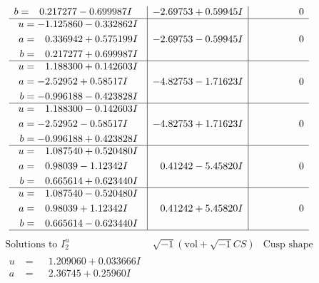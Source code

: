 \documentclass[1p]{elsarticle_modified}
\theoremstyle{definition}
\newcommand{\I}{\sqrt{-1}}
\begin{document}
$$\begin{array}{c|c|c}
\begin{aligned}
b &= \phantom{-}0.217277 - 0.699987 I\end{aligned}
 & -2.69753 + 0.59945 I & \phantom{-0.000000 } 0 \\ \hline\begin{aligned}
u &= -1.125860 - 0.332862 I \\
a &= \phantom{-}0.336942 + 0.575199 I \\
b &= \phantom{-}0.217277 + 0.699987 I\end{aligned}
 & -2.69753 - 0.59945 I & \phantom{-0.000000 } 0 \\ \hline\begin{aligned}
u &= \phantom{-}1.188300 + 0.142603 I \\
a &= -2.52952 + 0.58517 I \\
b &= -0.996188 - 0.423828 I\end{aligned}
 & -4.82753 - 1.71623 I & \phantom{-0.000000 } 0 \\ \hline\begin{aligned}
u &= \phantom{-}1.188300 - 0.142603 I \\
a &= -2.52952 - 0.58517 I \\
b &= -0.996188 + 0.423828 I\end{aligned}
 & -4.82753 + 1.71623 I & \phantom{-0.000000 } 0 \\ \hline\begin{aligned}
u &= \phantom{-}1.087540 + 0.520480 I \\
a &= \phantom{-}0.98039 - 1.12342 I \\
b &= \phantom{-}0.665614 + 0.623440 I\end{aligned}
 & \phantom{-}0.41242 - 5.45820 I & \phantom{-0.000000 } 0 \\ \hline\begin{aligned}
u &= \phantom{-}1.087540 - 0.520480 I \\
a &= \phantom{-}0.98039 + 1.12342 I \\
b &= \phantom{-}0.665614 - 0.623440 I\end{aligned}
 & \phantom{-}0.41242 + 5.45820 I & \phantom{-0.000000 } 0\\
 \hline 
 \end{array}$$\newpage$$\begin{array}{c|c|c}  
\text{Solutions to }I^u_{2}& \I (\text{vol} + \sqrt{-1}CS) & \text{Cusp shape}\\
 \hline 
\begin{aligned}
u &= \phantom{-}1.209060 + 0.033666 I \\
a &= \phantom{-}2.36745 + 0.25960 I \\

\end{aligned}
\end{array}$$
\end{document}
